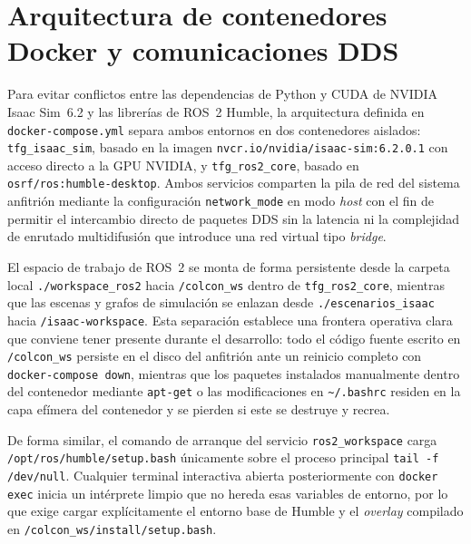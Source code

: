 \section{Arquitectura de contenedores Docker y comunicaciones DDS}
\label{sec:docker_dds}

Para evitar conflictos entre las dependencias de Python y CUDA de NVIDIA Isaac Sim~6.2 y las librerías de ROS~2 Humble, la arquitectura definida en \texttt{docker-compose.yml} separa ambos entornos en dos contenedores aislados: \texttt{tfg\_isaac\_sim}, basado en la imagen \texttt{nvcr.io/nvidia/isaac-sim:6.2.0.1} con acceso directo a la GPU NVIDIA, y \texttt{tfg\_ros2\_core}, basado en \texttt{osrf/ros:humble-desktop}. Ambos servicios comparten la pila de red del sistema anfitrión mediante la configuración \texttt{network\_mode} en modo \textit{host} con el fin de permitir el intercambio directo de paquetes DDS sin la latencia ni la complejidad de enrutado multidifusión que introduce una red virtual tipo \textit{bridge}.

El espacio de trabajo de ROS~2 se monta de forma persistente desde la carpeta local \texttt{./workspace\_ros2} hacia \texttt{/colcon\_ws} dentro de \texttt{tfg\_ros2\_core}, mientras que las escenas y grafos de simulación se enlazan desde \texttt{./escenarios\_isaac} hacia \texttt{/isaac-workspace}. Esta separación establece una frontera operativa clara que conviene tener presente durante el desarrollo: todo el código fuente escrito en \texttt{/colcon\_ws} persiste en el disco del anfitrión ante un reinicio completo con \texttt{docker-compose down}, mientras que los paquetes instalados manualmente dentro del contenedor mediante \texttt{apt-get} o las modificaciones en \texttt{\textasciitilde/.bashrc} residen en la capa efímera del contenedor y se pierden si este se destruye y recrea.

De forma similar, el comando de arranque del servicio \texttt{ros2\_workspace} carga \texttt{/opt/ros/humble/setup.bash} únicamente sobre el proceso principal \texttt{tail -f /dev/null}. Cualquier terminal interactiva abierta posteriormente con \texttt{docker exec} inicia un intérprete limpio que no hereda esas variables de entorno, por lo que exige cargar explícitamente el entorno base de Humble y el \textit{overlay} compilado en \texttt{/colcon\_ws/install/setup.bash}.


